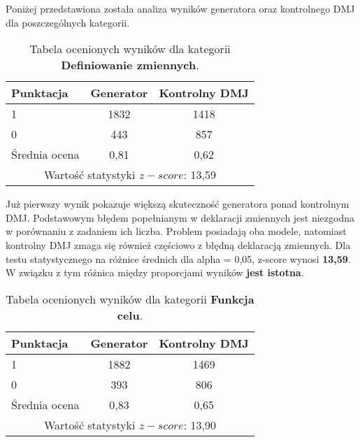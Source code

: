 Poniżej przedstawiona została analiza wyników generatora oraz kontrolnego DMJ dla poszczególnych kategorii.

\begin{table}[H]
\caption{Tabela ocenionych wyników dla kategorii \textbf{Definiowanie zmiennych}.}\label{tab:tabela12}
\centering%
\begin{tabular}{|l|c|c|}
\hline
\textbf{Punktacja} & \textbf{Generator} & \textbf{Kontrolny DMJ}\\
\hline
1 & 1832 & 1418 \\
\hline
0 & 443 & 857 \\
\hline
Średnia ocena & 0,81 & 0,62 \\
\hline
\multicolumn{3}{|c|}{Wartość statystyki \( z-score \): 13,59} \\
\hline
\end{tabular}
\end{table}


Już pierwszy wynik pokazuje większą skuteczność generatora ponad kontrolnym DMJ. Podstawowym błędem popełnianym w deklaracji zmiennych jest niezgodna w porównaniu z zadaniem ich liczba. Problem posiadają oba modele, natomiast kontrolny DMJ zmaga się również częściowo z błędną deklaracją zmiennych. Dla testu statystycznego na różnice średnich dla alpha = 0,05, z-score wynosi \textbf{13,59}. W związku z tym różnica między proporcjami wyników \textbf{jest istotna}.


\begin{table}[H]
\caption{Tabela ocenionych wyników dla kategorii \textbf{Funkcja celu}.}\label{tab:tabela13}
\centering%
\begin{tabular}{|l|c|c|}
\hline
\textbf{Punktacja} & \textbf{Generator} & \textbf{Kontrolny DMJ}\\
\hline
1 & 1882 & 1469 \\
\hline
0 & 393 & 806 \\
\hline
Średnia ocena & 0,83 & 0,65 \\
\hline
\multicolumn{3}{|c|}{Wartość statystyki \( z-score \): 13,90} \\
\hline
\end{tabular}
\end{table}

